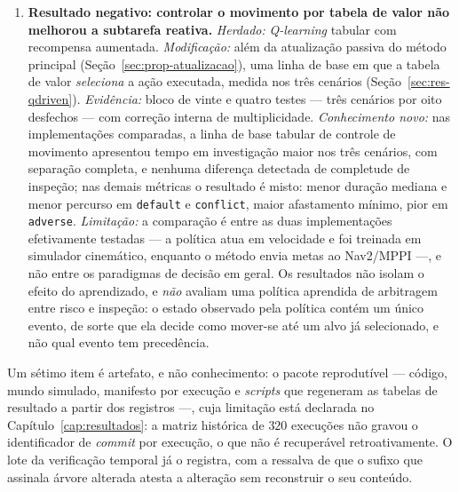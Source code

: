 \begin{enumerate}
    \item \textbf{Resultado negativo: controlar o movimento por tabela de valor não
    melhorou a subtarefa reativa.} \emph{Herdado:} \textit{Q-learning} tabular com
    recompensa aumentada.
    \emph{Modificação:} além da atualização passiva do método principal
    (Seção~\ref{sec:prop-atualizacao}), uma linha de base em que a tabela de valor
    \emph{seleciona} a ação executada, medida nos três cenários
    (Seção~\ref{sec:res-qdriven}). \emph{Evidência:} bloco de vinte e quatro testes --- três
    cenários por oito desfechos --- com correção interna de multiplicidade. \emph{Conhecimento novo:} nas implementações
    comparadas, a linha de base tabular de controle de movimento apresentou tempo em
    investigação maior nos três cenários, com separação completa, e nenhuma diferença
    detectada de completude de inspeção; nas demais métricas o resultado é misto: menor duração mediana e menor percurso em \texttt{default} e \texttt{conflict},
    maior afastamento mínimo, pior em \texttt{adverse}. \emph{Limitação:} a comparação
    é entre as duas implementações efetivamente testadas --- a política atua em
    velocidade e foi treinada em simulador cinemático, enquanto o método envia metas ao
    Nav2/MPPI ---, e não entre os paradigmas de decisão em geral. Os resultados não
    isolam o efeito do aprendizado, e \emph{não} avaliam uma política aprendida de
    arbitragem entre risco e inspeção: o estado observado pela política contém um único
    evento, de sorte que ela decide como mover-se até um alvo já selecionado, e não
    qual evento tem precedência.
\end{enumerate}

Um sétimo item é artefato, e não conhecimento: o pacote reprodutível
--- código, mundo simulado, manifesto por execução e \textit{scripts} que regeneram as
tabelas de resultado a partir dos registros ---, cuja limitação está declarada no
Capítulo~\ref{cap:resultados}: a matriz histórica de $320$ execuções não gravou o
identificador de \textit{commit} por execução, o que não é recuperável
retroativamente. O lote da verificação temporal já o registra, com a ressalva de que o
sufixo que assinala árvore alterada atesta a alteração sem reconstruir o seu conteúdo.

